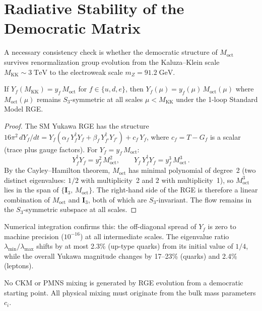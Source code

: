 \section{Radiative Stability of the Democratic Matrix}
\label{sec:4-radiative-stability}

A necessary consistency check is whether the democratic structure of $M_{\mathrm{oct}}$ survives renormalization group evolution from the Kaluza--Klein scale $M_{\mathrm{KK}} \sim 3\;\mathrm{TeV}$ to the electroweak scale $m_Z = 91.2\;\mathrm{GeV}$.

\begin{proposition}\label{prop:4-s3-rge}
If $Y_f(M_{\mathrm{KK}}) = y_f\, M_{\mathrm{oct}}$ for $f \in \{u, d, e\}$, then $Y_f(\mu) = y_f(\mu)\, M_{\mathrm{oct}}(\mu)$ where $M_{\mathrm{oct}}(\mu)$ remains $S_3$-symmetric at all scales $\mu < M_{\mathrm{KK}}$ under the 1-loop Standard Model RGE.
\end{proposition}

\begin{proof}
The SM Yukawa RGE has the structure $16\pi^2\, dY_f/dt = Y_f(\alpha_f\, Y_f^\dagger Y_f + \beta_f\, Y_{f'}^\dagger Y_{f'}) + c_f\, Y_f$, where $c_f = T - G_f$ is a scalar (trace plus gauge factors). For $Y_f = y_f\, M_{\mathrm{oct}}$:
\begin{equation}
  Y_f^\dagger Y_f = y_f^2\, M_{\mathrm{oct}}^2, \qquad
  Y_f\, Y_f^\dagger Y_f = y_f^3\, M_{\mathrm{oct}}^3\,.
  \label{eq:4-91}
\end{equation}
By the Cayley--Hamilton theorem, $M_{\mathrm{oct}}$ has minimal polynomial of degree~2 (two distinct eigenvalues: $1/2$ with multiplicity~2 and $2$ with multiplicity~1), so $M_{\mathrm{oct}}^3$ lies in the span of $\{\mathbf{I}_3,\, M_{\mathrm{oct}}\}$. The right-hand side of the RGE is therefore a linear combination of $M_{\mathrm{oct}}$ and $\mathbf{I}_3$, both of which are $S_3$-invariant. The flow remains in the $S_3$-symmetric subspace at all scales.
\end{proof}

Numerical integration confirms this: the off-diagonal spread of $Y_f$ is zero to machine precision ($10^{-16}$) at all intermediate scales. The eigenvalue ratio $\lambda_{\min}/\lambda_{\max}$ shifts by at most 2.3\% (up-type quarks) from its initial value of $1/4$, while the overall Yukawa magnitude changes by 17--23\% (quarks) and 2.4\% (leptons).

\begin{corollary}\label{cor:4-no-ckm-from-rge}
No CKM or PMNS mixing is generated by RGE evolution from a democratic starting point. All physical mixing must originate from the bulk mass parameters $c_i$.
\end{corollary}

